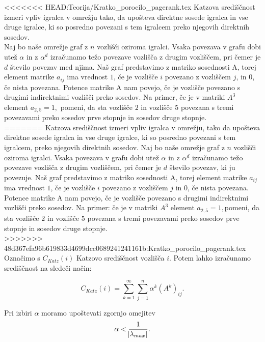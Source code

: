 \documentclass[a4paper]{article}
\begin{document}
<<<<<<< HEAD:Teorija/Kratko_porocilo_pagerank.tex
\hspace{4.8mm}Katzova središčnost izmeri vpliv igralca v omrežju tako, da upošteva direktne sosede igralca in vse druge igralce, ki so posredno povezani s tem igralcem preko njegovih direktnih sosedov. \\
Naj bo naše omrežje graf z $n$ vozlišči oziroma igralci. Vsaka povezava v grafu dobi utež $\alpha$ in z $\alpha^{d}$ izračunamo težo povezave vozlišča z drugim vozliščem, pri čemer je $d$ število povezav med njima. Naš graf predstavimo z matriko sosednosti A, torej element matrike $a_{ij}$ ima vrednost $1$, če je vozlišče $i$ povezano z vozliščem $j$, in $0$, če nista povezana. Potence matrike A nam povejo, če je vozlišče povezano s drugimi indirektnimi vozlišči preko sosedov. Na primer, če je v matriki $A^{3}$ element $a_{2,5}  = 1,$ pomeni, da sta vozlišče $2$ in vozlišče $5$ povezana s tremi povezavami preko sosedov prve stopnje in sosedov druge stopnje. \\
=======
Katzova središčnost izmeri vpliv igralca v omrežju, tako da upošteva direktne sosede igralca in vse druge igralce, ki so posredno povezani s tem igralcem, preko njegovih direktnih sosedov. Naj bo naše omrežje graf z $n$ vozlišči oziroma igralci. Vsaka povezava v grafu dobi utež $\alpha$ in z $\alpha^{d}$ izračunamo težo povezave vozlišča z drugim vozliščem, pri čemer je $d$ število povezav, ki ju povezuje. Naš graf predstavimo z matriko sosednosti A, torej element matrike $a_{ij}$ ima vrednost $1$, če je vozlišče $i$ povezano z vozliščem $j$ in $0$, če nista povezana. Potence matrike A nam povejo, če je vozlišče povezano s drugimi indirektnimi vozlišči preko sosedov. Na primer: če je v matriki $A^{3}$ element $a_{2,5}  = 1,$pomeni, da sta vozlišče $2$ in vozlišče $5$ povezana s tremi povezavami preko sosedov prve stopnje in sosedov druge stopnje. \\
>>>>>>> 48d367efa96b619833d4699dcc0689241241161b:Kratko_porocilo_pagerank.tex
Označimo s $C_{Katz}(i)$ Katzovo središčnost vozlišča $i$. Potem lahko izračunamo središčnost na sledeči način:

$$C_{Katz}(i) = \sum_{k=1}^{\infty}\sum_{j=1}^{n}\alpha^{k}(A^{k})_{ij}.$$

Pri izbiri $\alpha$ moramo upoštevati zgornjo omejitev $$\alpha < \frac{1}{\abs{\lambda_{max}}}.$$
\end{document}

